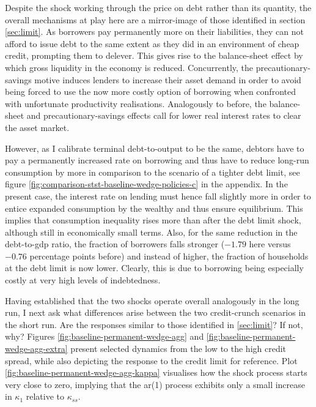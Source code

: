\documentclass[a4paper,12pt]{article} %
\numberwithin{equation}{section} %
\numberwithin{figure}{section}
\numberwithin{table}{section}
\begin{document}
Despite the shock working through the price on debt rather than its quantity, the overall mechanisms at play here are a mirror-image of those identified in section \ref{sec:limit}. As borrowers pay permanently more on their liabilities, they can not afford to issue debt to the same extent as they did in an environment of cheap credit, prompting them to delever. This gives rise to the balance-sheet effect by which gross liquidity in the economy is reduced. Concurrently, the precautionary-savings motive induces lenders to increase their asset demand in order to avoid being forced to use the now more costly option of borrowing when confronted with unfortunate productivity realisations. Analogously to before, the balance-sheet and precautionary-savings effects call for lower real interest rates to clear the asset market. 

However, as I calibrate terminal debt-to-output to be the same, debtors have to pay a permanently increased rate on borrowing and thus have to reduce long-run consumption by more in comparison to the scenario of a tighter debt limit, see figure \ref{fig:comparison-stst-baseline-wedge-policies-c} in the appendix. In the present case, the interest rate on lending must hence fall slightly more in order to entice expanded consumption by the wealthy and thus ensure equilibrium. This implies that consumption inequality rises more than after the debt limit shock, although still in economically small terms. Also, for the same reduction in the debt-to-\Gls{gdp} ratio, the fraction of borrowers falls stronger ($-1.79$ here versus $-0.76$ percentage points before) and instead of higher, the fraction of households at the debt limit is now lower. Clearly, this is due to borrowing being especially costly at very high levels of indebtedness.

Having established that the two shocks operate overall analogously in the long run, I next ask what differences arise between the two credit-crunch scenarios in the short run. Are the responses similar to those identified in \ref{sec:limit}? If not, why? Figures \ref{fig:baseline-permanent-wedge-agg} and \ref{fig:baseline-permanent-wedge-agg-extra} present selected dynamics from the low to the high credit spread, while also depicting the response to the credit limit for reference. Plot \ref{fig:baseline-permanent-wedge-agg-kappa} visualises how the shock process starts very close to zero, implying that the \Gls{ar}(1) process exhibits only a small increase in $\kappa_1$ relative to $\kappa_{ss}$. 
\end{document}
